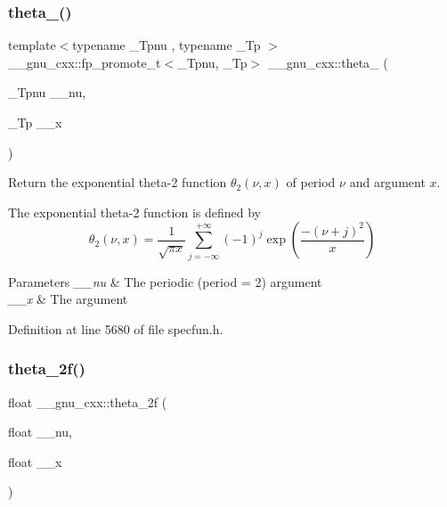 \subsubsection{\texorpdfstring{theta\+\_()}{theta\_2()}}
{\footnotesize\ttfamily template$<$typename \+\_\+\+Tpnu , typename \+\_\+\+Tp $>$ \\
\+\_\+\+\_\+gnu\+\_\+cxx\+::fp\+\_\+promote\+\_\+t$<$\+\_\+\+Tpnu, \+\_\+\+Tp$>$ \+\_\+\+\_\+gnu\+\_\+cxx\+::theta\+\_ (\begin{DoxyParamCaption}\item[{\+\_\+\+Tpnu}]{\+\_\+\+\_\+nu,  }\item[{\+\_\+\+Tp}]{\+\_\+\+\_\+x }\end{DoxyParamCaption})\hspace{0.3cm}{\ttfamily [inline]}}

Return the exponential theta-\/2 function $ \theta_2(\nu,x) $ of period $ \nu $ and argument $ x $.

The exponential theta-\/2 function is defined by \[ \theta_2(\nu,x) = \frac{1}{\sqrt{\pi x}} \sum_{j=-\infty}^{+\infty} (-1)^j \exp\left( \frac{-(\nu + j)^2}{x} \right) \]


\begin{DoxyParams}{Parameters}
{\em \+\_\+\+\_\+nu} & The periodic (period = 2) argument \\
\hline
{\em \+\_\+\+\_\+x} & The argument \\
\hline
\end{DoxyParams}


Definition at line 5680 of file specfun.\+h.

\mbox{\label{group__gnu__math__spec__func_ga78e832796aedf5159b142801e1184392}} 
\subsubsection{\texorpdfstring{theta\+\_\+2f()}{theta\_2f()}}
{\footnotesize\ttfamily float \+\_\+\+\_\+gnu\+\_\+cxx\+::theta\+\_\+2f (\begin{DoxyParamCaption}\item[{float}]{\+\_\+\+\_\+nu,  }\item[{float}]{\+\_\+\+\_\+x }\end{DoxyParamCaption})\hspace{0.3cm}{\ttfamily [inline]}}


